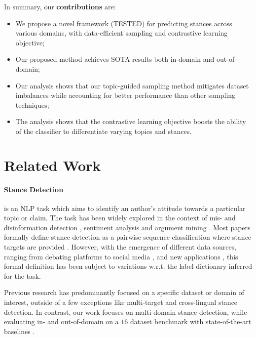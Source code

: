 \documentclass[11pt]{article}
\begin{document}
In summary, our \textbf{contributions} are:
\begin{itemize}[noitemsep]
    \item We propose a novel framework (TESTED) for predicting stances across various domains, with data-efficient sampling and contrastive learning objective;
    \item Our proposed method achieves SOTA results both in-domain and out-of-domain;
    \item Our analysis shows that our topic-guided sampling method mitigates dataset imbalances while accounting for better performance than other sampling techniques; 
    \item The analysis shows that the contrastive learning objective boosts the ability of the classifier to differentiate varying topics and stances.
\end{itemize}

\section{Related Work}
\label{sec:related_work}

\paragraph{Stance Detection} is an NLP task which aims to identify an author's attitude towards a particular topic or claim. The task has been widely explored in the context of mis- and disinformation detection \citep{ferreira2016emergent,hanselowski2018retrospective,ZUBIAGA2018273,hardalov2021survey}, sentiment analysis \citep{mohammad2017stance, aldayel2019your} and argument mining \citep{boltuvzic2014back,sobhani2015argumentation,wang2019survey}. Most papers formally define stance detection as a pairwise sequence classification where stance targets are provided \citep{kuccuk2020stance}. However, with the emergence of different data sources, ranging from debating platforms \citep{somasundaran2010recognizing,hasan2014you,aharoni2014benchmark} to social media \citep{mohammad2016semeval,gorrell2019semeval}, and new applications \citep{zubiaga2018detection,hardalov2021survey}, this formal definition has been subject to variations w.r.t. the label dictionary inferred for the task.

Previous research has predominantly focused on a specific dataset or domain of interest, outside of a few exceptions like multi-target \citep{sobhani2017dataset,wei2018multi} and cross-lingual \citep{hardalov2022few} stance detection. In contrast, our work focuses on multi-domain stance detection, while evaluating in- and out-of-domain on a $16$ dataset benchmark with state-of-the-art baselines \citep{hardalov2021cross}.
\end{document}
